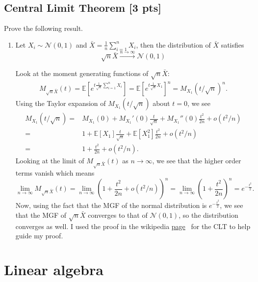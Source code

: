 \documentclass[a4paper]{article}
\theoremstyle{definition}
\def\E{\mathbb E}
\newenvironment{soln}{
	\leavevmode\color{blue}\ignorespaces
}{}
\begin{document}
	\subsection{Central Limit Theorem [3 pts]}
	Prove the following result.
	\begin{enumerate}
		\item Let $X_i\sim\mathcal{N}(0, 1)$ and $\bar{X} = \frac{1}{n}\sum_{i=1}^n X_i$, then the distribution of $\bar{X}$ satisfies 
		$$\sqrt{n}\bar{X}\overset{n\rightarrow\infty}{\longrightarrow}\mathcal{N}(0, 1)$$
		
		\begin{soln}  Look at the moment generating functions of $ \sqrt{n}\bar X $:
		\begin{align*}
			M_{\sqrt{n}\bar{X}}(t) = \E[e^{t\frac{1}{\sqrt{n}}\sum_{i=1}^n X_i}] = \E[e^{t\frac{1}{\sqrt{n}}X_1}]^n = M_{X_1}(t/\sqrt{n})^n.
	\end{align*} 
	Using the Taylor expansion of $ M_{X_1}(t/\sqrt{n}) $ about $ t=0 $, we see
	\begin{align*}
		M_{X_1}(t/\sqrt{n}) =& M_{X_1}(0) + M_{X_1}'(0) \frac{t}{\sqrt{n}} + M_{X_1}''(0) \frac{t^2}{2n} + o(t^2/n)\\
		=& 1 + \E[X_1]\frac{t}{\sqrt{n}} + \E[X_1^2]\frac{t^2}{2n} + o(t^2/n)\\
		=& 1+ \frac{t^2}{2n} + o(t^2/n).
	\end{align*}
	Looking at the limit of $ M_{\sqrt{n}\bar{X}}(t) $ as $ n\to \infty $, we see that the higher order terms vanish which means
	\[ \lim\limits_{n\to \infty} M_{\sqrt{n}\bar{X}}(t) = \lim\limits_{n\to \infty} (1+ \frac{t^2}{2n} + o(t^2/n))^n = \lim\limits_{n\to \infty} (1+ \frac{t^2}{2n})^n = e^{-\frac{t^2}{2}}. \]
	Now, using the fact that the MGF of the normal distribution is $ e^{-\frac{t^2}{2}} $, we see that the MGF of $ \sqrt{n}\bar{X} $ converges to that of $ \mathcal{N}(0,1) $, so the distribution converges as well. I used the proof in the wikipedia
	\color{red}\hyperref{https://en.wikipedia.org/wiki/Central_limit_theorem#Proof_of_classical_CLT}{}{}{page}\color{blue}~ for the CLT to help guide my proof.

\end{soln}
		
	\end{enumerate}
	
	
	
	\section{Linear algebra}
	
\end{document}
